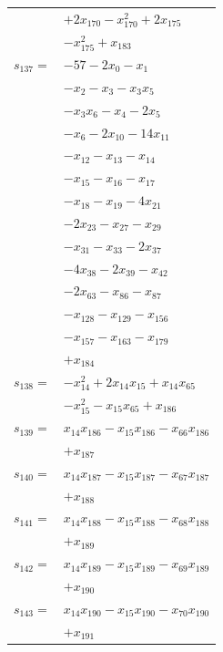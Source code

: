 \begin{longtable}{@{}r@{\;}l@{}}
 & \(\displaystyle +2x_{170} -x_{170}^{2} +2x_{175}\) \\
 & \(\displaystyle -x_{175}^{2} +x_{183}\) \\[3pt]
\(s_{137}=\) & \(\displaystyle -57 -2x_{0} -x_{1}\) \\
 & \(\displaystyle -x_{2} -x_{3} -x_{3}x_{5}\) \\
 & \(\displaystyle -x_{3}x_{6} -x_{4} -2x_{5}\) \\
 & \(\displaystyle -x_{6} -2x_{10} -14x_{11}\) \\
 & \(\displaystyle -x_{12} -x_{13} -x_{14}\) \\
 & \(\displaystyle -x_{15} -x_{16} -x_{17}\) \\
 & \(\displaystyle -x_{18} -x_{19} -4x_{21}\) \\
 & \(\displaystyle -2x_{23} -x_{27} -x_{29}\) \\
 & \(\displaystyle -x_{31} -x_{33} -2x_{37}\) \\
 & \(\displaystyle -4x_{38} -2x_{39} -x_{42}\) \\
 & \(\displaystyle -2x_{63} -x_{86} -x_{87}\) \\
 & \(\displaystyle -x_{128} -x_{129} -x_{156}\) \\
 & \(\displaystyle -x_{157} -x_{163} -x_{179}\) \\
 & \(\displaystyle +x_{184}\) \\[3pt]
\(s_{138}=\) & \(\displaystyle -x_{14}^{2} +2x_{14}x_{15} +x_{14}x_{65}\) \\
 & \(\displaystyle -x_{15}^{2} -x_{15}x_{65} +x_{186}\) \\[3pt]
\(s_{139}=\) & \(\displaystyle x_{14}x_{186} -x_{15}x_{186} -x_{66}x_{186}\) \\
 & \(\displaystyle +x_{187}\) \\[3pt]
\(s_{140}=\) & \(\displaystyle x_{14}x_{187} -x_{15}x_{187} -x_{67}x_{187}\) \\
 & \(\displaystyle +x_{188}\) \\[3pt]
\(s_{141}=\) & \(\displaystyle x_{14}x_{188} -x_{15}x_{188} -x_{68}x_{188}\) \\
 & \(\displaystyle +x_{189}\) \\[3pt]
\(s_{142}=\) & \(\displaystyle x_{14}x_{189} -x_{15}x_{189} -x_{69}x_{189}\) \\
 & \(\displaystyle +x_{190}\) \\[3pt]
\(s_{143}=\) & \(\displaystyle x_{14}x_{190} -x_{15}x_{190} -x_{70}x_{190}\) \\
 & \(\displaystyle +x_{191}\) \\[3pt]

\end{longtable}
